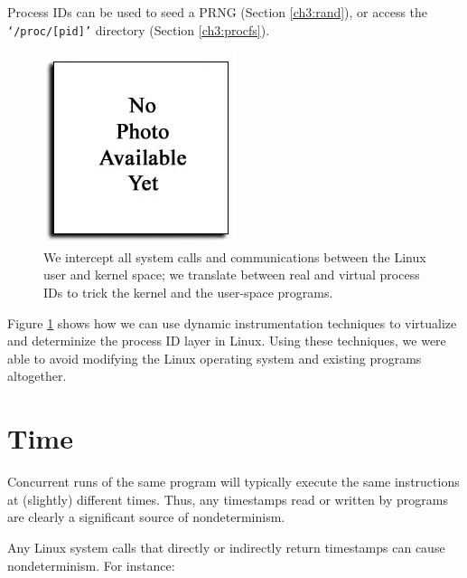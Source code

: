Process IDs can be used to seed a PRNG (Section \ref{ch3:rand}),
or access the \texttt{`/proc/[pid]'} directory (Section \ref{ch3:procfs}). 

\begin{figure}[h]
  \center
  \includegraphics[trim=0cm 0cm 0cm 0cm, scale=0.75]{none.jpg}
  \caption[Virtualizing the process ID layer using Pin]%
  {We intercept all system calls and communications
  between the Linux user and kernel space; we
  translate between real and virtual process IDs
  to trick the kernel and the user-space programs.}
  \label{ch3:pidfig}
\end{figure} 

Figure \ref{ch3:pidfig} shows how we can use dynamic instrumentation
techniques to virtualize and determinize the process ID layer in Linux.
Using these techniques, we were able to avoid modifying
the Linux operating system and existing programs
altogether.

\section{Time} \label{ch3:time}
Concurrent runs of the same program will typically
execute the same instructions at (slightly) different times.
Thus, any timestamps read or written
by programs are clearly a significant source of nondeterminism.

Any Linux system calls that directly or indirectly return timestamps
can cause nondeterminism. For instance:

